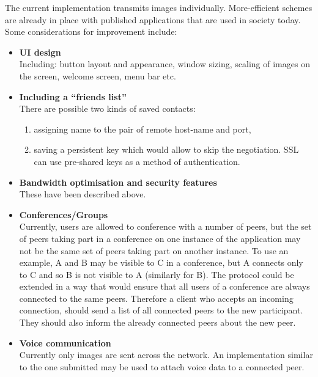 \documentclass[10pt, a4paper]{article}
\begin{document}
The current implementation transmits images individually.
More-efficient schemes are already in place with published applications that are used in society today.
Some considerations for improvement include:
\begin{itemize}
\item \textbf{UI design} \\
Including: button layout and appearance, window sizing, scaling of images on the screen, welcome screen, menu bar etc.

\item \textbf{Including a ``friends list''} \\
There are possible two kinds of saved contacts:
\begin{enumerate}
	\item assigning name to the pair of remote host-name and port,
	\item saving a persistent key which would allow to skip the negotiation.
		SSL can use pre-shared keys as a method of authentication.
\end{enumerate}

\item \textbf{Bandwidth optimisation and security features} \\
These have been described above.

\item \textbf{Conferences/Groups} \\
Currently, users are allowed to conference with a number of peers, but the set of peers taking part in a conference on one instance of the application may not be the same set of peers taking part on another instance.
To use an example, A and B may be visible to C in a conference, but A connects only to C and so B is not visible to A (similarly for B).
The protocol could be extended in a way that would ensure that all users of a conference are always connected to the same peers.
Therefore a client who accepts an incoming connection, should send a list of all connected peers to the new participant.
They should also inform the already connected peers about the new peer.

\item \textbf{Voice communication} \\
Currently only images are sent across the network.
An implementation similar to the one submitted may be used to attach voice data to a connected peer.
\end{itemize}

\begingroup
\raggedright



\endgroup
\end{document}
